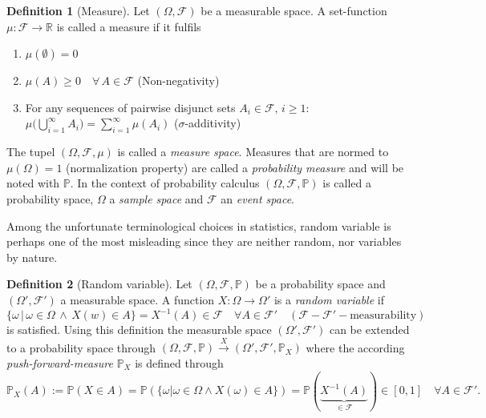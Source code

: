 \documentclass[
]{report}
\theoremstyle{definition}
\theoremstyle{definition}
\newtheorem{definition}{Definition}[section]
\begin{document}
\begin{definition}[Measure]
Let $(\Omega, \mathcal{F})$ be a measurable space. A set-function $\mu : \mathcal{F} \rightarrow \mathbb{R}$ is called a {measure} if it fulfils
\begin{enumerate}
  \item $\mu(\emptyset) = 0$ 
  \item $\mu(A) \geq 0 \quad \forall \, A \in \mathcal{F}$ \quad (Non-negativity)
  \item For any sequences of pairwise disjunct sets $A_i \in \mathcal{F}, \, i \geq 1$: \newline
    $\mu \big(\bigcup_{i=1}^{\infty} A_i \big) = \sum_{i=1}^{\infty} \mu(A_i)$ \quad ($\sigma$-additivity)
\end{enumerate}
The tupel $(\Omega, \mathcal{F}, \mu)$ is called a \textit{measure space}. Measures that are normed to $\mu(\Omega) = 1$ (normalization property) are called a \textit{probability measure} and will be noted with $\mathbb{P}$. In the context of probability calculus $(\Omega, \mathcal{F}, \mathbb{P})$ is called a probability space, $\Omega$ a \textit{sample space} and $\mathcal{F}$ an \textit{event space}.
\end{definition}

Among the unfortunate terminological choices in statistics, random
variable is perhaps one of the most misleading since they are neither
random, nor variables by nature.

\begin{definition}[Random variable]
Let $(\Omega, \mathcal{F}, \mathbb{P})$ be a probability space and $(\Omega', \mathcal{F}')$ a measurable space. A function $X: \Omega \rightarrow \Omega'$ is a \textit{random variable} if 
$$ \{\omega \, | \,  \omega \in \Omega \, \land \, X(w) \in A \} = X^{-1} (A) \in \mathcal{F} \quad \forall A \in \mathcal{F}' \quad (\mathcal{F}-\mathcal{F}'-\text{measurability})$$
is satisfied. Using this definition the measurable space $(\Omega', \mathcal{F}')$ can be extended to a probability space through \mbox{$(\Omega, \mathcal{F}, \mathbb{P}) \xrightarrow{X} (\Omega', \mathcal{F}', \mathbb{P}_X)$} where the according \textit{push-forward-measure} $\mathbb{P}_X$ is defined through 
$$\mathbb{P}_X (A) := \mathbb{P}(X \in A) \overset{}{=} \mathbb{P} (\{\omega | \omega \in \Omega \land X(\omega) \in A \}) \overset{\text{}}{=} \mathbb{P}( \underbrace{X^{-1} (A)}_{\in \mathcal{F}}) \in [0,1] \quad \forall A \in \mathcal{F}'.$$
\end{definition}
\end{document}
